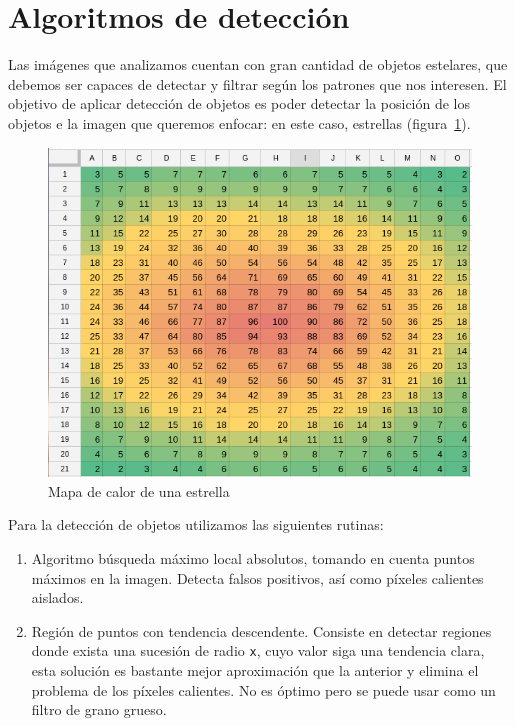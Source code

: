 \section{Algoritmos de detección}

Las imágenes que analizamos cuentan con gran cantidad de objetos estelares, que debemos ser capaces de detectar y filtrar según los patrones que nos interesen. El objetivo de aplicar detección de objetos es poder detectar la posición de los objetos e la imagen que queremos enfocar: en este caso, estrellas (figura~\ref{fig:estrella}).

\begin{figure}
	\centering
	\includegraphics[width=0.8\linewidth]{../images/estrella}
	\caption{Mapa de calor de una estrella}
	\label{fig:estrella}
\end{figure}

Para la detección de objetos utilizamos las siguientes rutinas:

\begin{enumerate}
	\item Algoritmo búsqueda máximo local absolutos, tomando en cuenta puntos máximos en la imagen. Detecta falsos positivos, así como píxeles calientes aislados.  
	
	\item Región de puntos con tendencia descendente. Consiste en detectar regiones donde exista una sucesión de radio \texttt{x}, cuyo valor siga una tendencia clara, esta solución es bastante mejor aproximación que la anterior y elimina el problema de los píxeles calientes. No es óptimo pero se puede usar como un filtro de grano grueso.
\end{enumerate}





